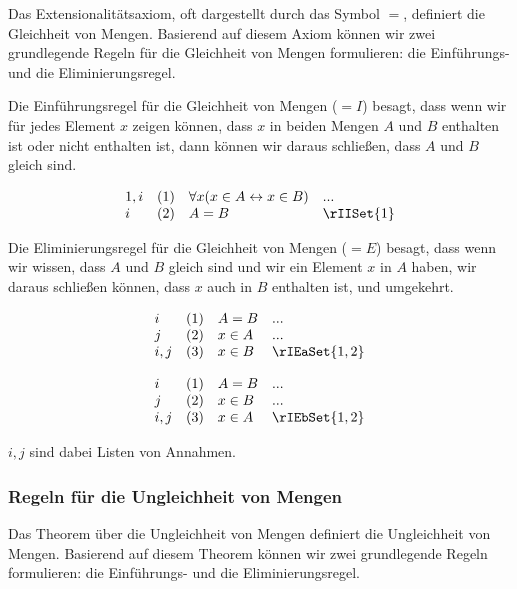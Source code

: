 \documentclass{book}
\theoremstyle{plain}
\theoremstyle{remark}
\theoremstyle{definition}
\begin{document}
Das Extensionalitätsaxiom, oft dargestellt durch das Symbol \(=\), definiert die Gleichheit von Mengen. Basierend auf diesem Axiom können wir zwei grundlegende Regeln für die Gleichheit von Mengen formulieren: die Einführungs- und die Eliminierungsregel.

Die Einführungsregel für die Gleichheit von Mengen (\(= I\)) besagt, dass wenn wir für jedes Element \(x\) zeigen können, dass \(x\) in beiden Mengen \(A\) und \(B\) enthalten ist oder nicht enthalten ist, dann können wir daraus schließen, dass \(A\) und \(B\) gleich sind.

\[
\begin{array}{llll}
	1,i & (1) & \forall x(x \in A \leftrightarrow x \in B) & ... \\
	i & (2) & A = B & \rIISet{1} \\
\end{array}
\]

Die Eliminierungsregel für die Gleichheit von Mengen (\(= E\)) besagt, dass wenn wir wissen, dass \(A\) und \(B\) gleich sind und wir ein Element \(x\) in \(A\) haben, wir daraus schließen können, dass \(x\) auch in \(B\) enthalten ist, und umgekehrt.

\[
\begin{array}{llll}
	i & (1) & A = B & ... \\
	j & (2) & x \in A & ... \\
	i,j & (3) & x \in B & \rIEaSet{1,2} \\
\end{array}
\]

\[
\begin{array}{llll}
	i & (1) & A = B & ... \\
	j & (2) & x \in B & ... \\
	i,j & (3) & x \in A & \rIEbSet{1,2} \\
\end{array}
\]

\(i,j\) sind dabei Listen von Annahmen.

\subsubsection{Regeln für die Ungleichheit von Mengen}
\label{rule:rNIIaSet} \label{rule:rNIIbSet} \label{rule:rNIESet}

Das Theorem über die Ungleichheit von Mengen definiert die Ungleichheit von Mengen. Basierend auf diesem Theorem können wir zwei grundlegende Regeln formulieren: die Einführungs- und die Eliminierungsregel.
\end{document}

